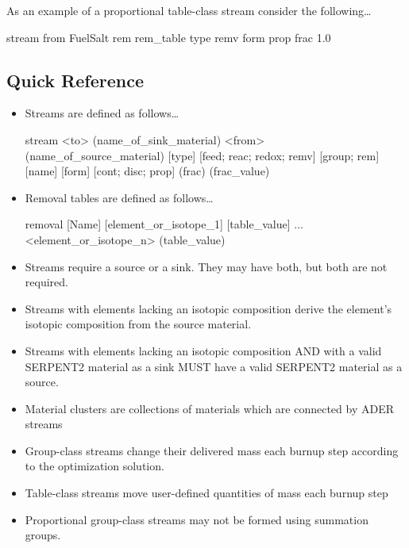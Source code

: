 As an example of a proportional table-class stream consider the following\ldots

\begin{li}
stream from FuelSalt rem rem_table type remv form prop frac 1.0
\end{li}

\subsection{Quick Reference}
\begin{itemize}
\item{Streams are defined as follows\ldots
\begin{lt}
stream <to> (name_of_sink_material) <from> (name_of_source_material)
    [type] [{feed; reac; redox; remv}] [{group; rem}] [name] 
    [form] [{cont; disc; prop}] (frac) (frac_value)
\end{lt}
    }
\item{Removal tables are defined as follows\ldots
\begin{lt}
removal [Name]
[element_or_isotope_1] [table_value]
...
<element_or_isotope_n> (table_value) 
\end{lt}
    }
\item{Streams require a source or a sink. They may have both, but both are not
required.}
\item{Streams with elements lacking an isotopic composition derive the
element's isotopic composition from the source material.}
\item{Streams with elements lacking an isotopic composition AND with a valid
SERPENT2 material as a sink MUST have a valid SERPENT2 material as a source.}
\item{Material clusters are collections of materials which are connected by
ADER streams}
\item{Group-class streams change their delivered mass each burnup step
according to the optimization solution.}
\item{Table-class streams move user-defined quantities of mass each burnup
step}
\item{Proportional group-class streams may not be formed using summation 
    groups.}
\end{itemize}
